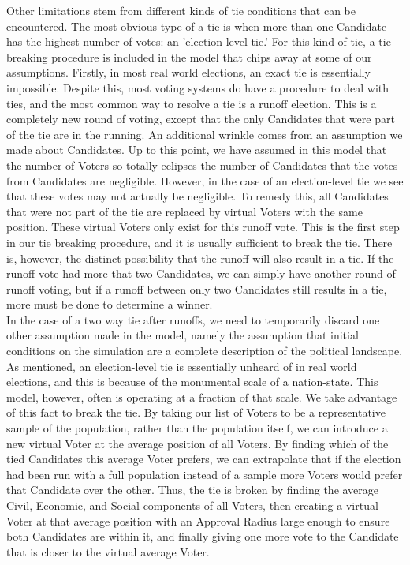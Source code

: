 \documentclass[12pt]{article}
\newcounter{step}
\begin{document}
\qquad Other limitations stem from different kinds of tie conditions that can be encountered. The most obvious type of a tie is when more than one Candidate has the highest number of votes: an 'election-level tie.' For this kind of tie, a tie breaking procedure is included in the model that chips away at some of our assumptions. Firstly, in most real world elections, an exact tie is essentially impossible. Despite this, most voting systems do have a procedure to deal with ties, and the most common way to resolve a tie is a runoff election. This is a completely new round of voting, except that the only Candidates that were part of the tie are in the running. An additional wrinkle comes from an assumption we made about Candidates. Up to this point, we have assumed in this model that the number of Voters so totally eclipses the number of Candidates that the votes from Candidates are negligible. However, in the case of an election-level tie we see that these votes may not actually be negligible. To remedy this, all Candidates that were not part of the tie are replaced by virtual Voters with the same position. These virtual Voters only exist for this runoff vote. This is the first step in our tie breaking procedure, and it is usually sufficient to break the tie. There is, however, the distinct possibility that the runoff will also result in a tie. If the runoff vote had more that two Candidates, we can simply have another round of runoff voting, but if a runoff between only two Candidates still results in a tie, more must be done to determine a winner. \\

\qquad In the case of a two way tie after runoffs, we need to temporarily discard one other assumption made in the model, namely the assumption that initial conditions on the simulation are a complete description of the political landscape. As mentioned, an election-level tie is essentially unheard of in real world elections, and this is because of the monumental scale of a nation-state. This model, however, often is operating at a fraction of that scale. We take advantage of this fact to break the tie. By taking our list of Voters to be a representative sample of the population, rather than the population itself, we can introduce a new virtual Voter at the average position of all Voters. By finding which of the tied Candidates this average Voter prefers, we can extrapolate that if the election had been run with a full population instead of a sample more Voters would prefer that Candidate over the other. Thus, the tie is broken by finding the average Civil, Economic, and Social components of all Voters, then creating a virtual Voter at that average position with an Approval Radius large enough to ensure both Candidates are within it, and finally giving one more vote to the Candidate that is closer to the virtual average Voter. \\
\end{document}
